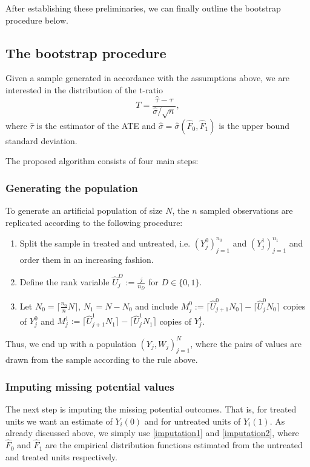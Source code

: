 \documentclass[aodsor,preprint]{imsart}
\numberwithin{equation}{section}
\theoremstyle{plain}
\begin{document}
After establishing these preliminaries, we can finally outline the bootstrap procedure below.

\subsection{The bootstrap procedure}

Given a sample generated in accordance with the assumptions above, we are interested in the distribution of the t-ratio
$$
T = \frac{\widehat{\tau} - \tau}{\widehat{\sigma} / \sqrt{n}},
$$
where $\widehat{\tau}$ is the estimator of the ATE and $\widehat{\sigma} = \widehat{\sigma}(\widehat{F}_0, \widehat{F}_1)$ is the upper bound standard deviation.

The proposed algorithm consists of four main steps:

\subsubsection{Generating the population}

To generate an artificial population of size $N$, the $n$ sampled observations are replicated according to the following procedure:
\begin{enumerate}
	\item Split the sample in treated and untreated, i.e. $(Y_j^0)_{j=1}^{n_0}$ and $(Y_j^1)_{j=1}^{n_1}$ and order them in an increasing fashion.
	\item Define the rank variable $\widehat{U}_j^D := \frac{j}{n_D}$ for $D \in \{0, 1\}$.
	\item Let $N_0 = \lceil \frac{n_0}{n} N \rceil$, $N_1 = N - N_0$ and include $M_j^0 := \lceil \widehat{U}_{j+1}^0 N_0 \rceil - \lceil \widehat{U}_{j}^0 N_0 \rceil$ copies of $Y_j^0$ and $M_j^1 := \lceil \widehat{U}_{j+1}^1 N_1 \rceil - \lceil \widehat{U}_{j}^1 N_1 \rceil$ copies of $Y_j^1$.
\end{enumerate}
Thus, we end up with a population $(Y_j, W_j)_{j=1}^N$, where the pairs of values are drawn from the sample according to the rule above.

\subsubsection{Imputing missing potential values}

The next step is imputing the missing potential outcomes. That is, for treated units we want an estimate of $Y_i(0)$ and for untreated units of $Y_i(1)$. As already discussed above, we simply use \ref{imputation1} and \ref{imputation2}, where $\widehat{F}_0$ and $\widehat{F}_1$ are the empirical distribution functions estimated from the untreated and treated units respectively.
\end{document}
